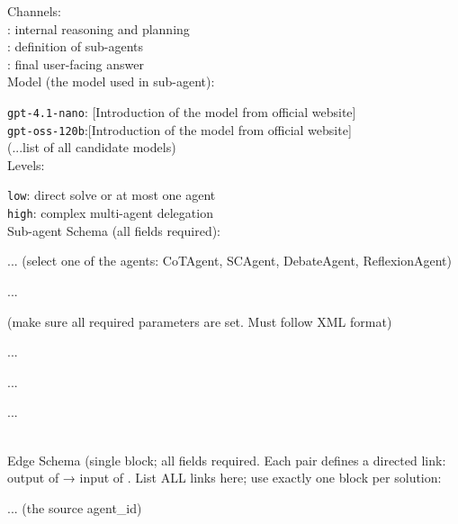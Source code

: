 \begin{developprompt}[title={Develop Prompt}]
Channels: \\
    : internal reasoning and planning \\
    : definition of sub-agents \\
    : final user-facing answer \\

Model (the model used in sub-agent):

    \texttt{gpt-4.1-nano}: [Introduction of the model from official website] \\
    \texttt{gpt-oss-120b}:[Introduction of the model from official website] \\
    (...list of all candidate models)\\

\masness Levels:

    \texttt{low}: direct solve or at most one agent \\
    \texttt{high}: complex multi-agent delegation\\
    
Sub-agent Schema (all fields required):\\


\quad{}
...
(select one of the agents: CoTAgent, SCAgent, DebateAgent, ReflexionAgent)

\quad{}
...

\quad{}
(make sure all required parameters are set. Must follow XML format)

\qquad{}...

\qquad{}...

\quad{}

\quad{}
...

 \\


Edge Schema (single block; all fields required. Each pair defines a directed link: output of  → input of . List ALL links here; use exactly one  block per solution:\\


\quad{}
...
(the source agent\_id)


\end{developprompt}
